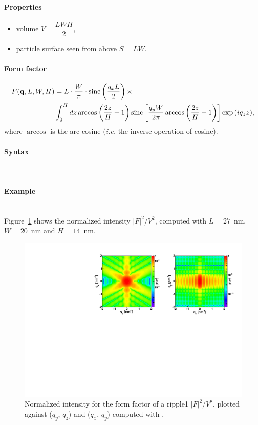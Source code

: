 \paragraph{Properties}
\begin{itemize}
\item volume $V = \dfrac{L W H}{2} $,
\item particle surface seen from above $S = L W$.
\end{itemize}

\paragraph{Form factor}
\begin{align*}
F(\mathbf{q},L,W,H) &=L \cdot \frac{W}{\pi}\cdot \operatorname{sinc}\left(\frac{q_xL}{2}\right)\times \\ &\int_0^H{dz \arccos\left(\frac{2z}{H}-1\right)\operatorname{sinc}\left[\frac{q_yW}{2\pi}\arccos\left(\frac{2z}{H} - 1\right)\right]\exp\left(iq_zz\right)},
\end{align*}
where $\arccos$ is the  arc cosine (\textit{i.e.} the inverse
operation of cosine).

\paragraph{Syntax}\strut\\

\paragraph{Example}\strut\\
Figure~\ref{fig:FFripple1Ex} shows the normalized intensity
$|F|^2/V^2$, computed with $L=27$~nm, $W=20$~nm and $H=14$~nm.

\begin{figure}[ht]
\begin{center}
\includegraphics[angle=-90,width=\textwidth]{fig/ff/figffripple1.pdf}
\end{center}
\caption{Normalized intensity for the form factor of a ripple1
  $|F|^2/V^2$, plotted against ($q_y$, $q_z$) and  ($q_x$, $q_y$)
  computed with .}
\label{fig:FFripple1Ex}
\end{figure}


